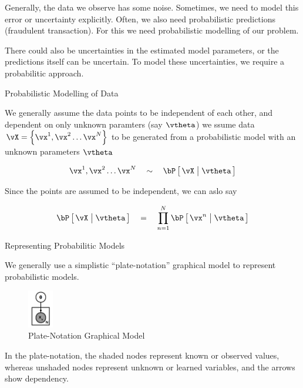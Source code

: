 \documentclass{article}
\begin{document}
\makeheader

Generally, the data we observe has some noise. Sometimes, we need to model this error or uncertainty explicitly. Often, we also need probabilistic predictions (fraudulent transaction). For this we need probabilistic modelling of our problem. \br

There could also be uncertainties in the estimated model parameters, or the predictions itself can be uncertain. To model these uncertainties, we require a probabilitic approach.

\begin{ssection}{Probabilistic Modelling of Data}

	We generally assume the data points to be independent of each other, and dependent on only unknown paramters (say $\vtheta$)  we ssume data $\vX = \set{\vx^1, \vx^2 \dots \vx^N}$ to be generated from a probabilistic model with an unknown parameters $\vtheta$

	\begin{align*}
		\vx^1, \vx^2 \dots \vx^N	\qsim	\prob{\vX \pipe \vtheta}
	\end{align*}

	Since the points are assumed to be independent, we can aslo say

	\begin{align*}
		\prob{\vX \pipe \vtheta}	\eq	\prod_{n = 1}^N \prob{\vx^n \pipe \vtheta}
	\end{align*}

	\begin{ssubsection}{Representing Probabilitic Models}

		We generally use a simplistic ``plate-notation'' graphical model to represent probabilistic models.

		\begin{figure}[h!]
			\centering
			\includegraphics[width=0.1\textwidth]{includes/scribe01/plate-graphical-model.png}
			\caption{Plate-Notation Graphical Model}
			\label{fig:plate-model}
		\end{figure}

		In the plate-notation, the shaded nodes represent known or observed values, whereas unshaded nodes represent unknown or learned variables, and the arrows show dependency. \br


\end{ssubsection}
\end{ssection}
\end{document}
